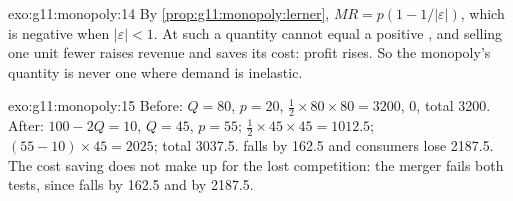 \begin{solution}{exo:g11:monopoly:14}
By \cref{prop:g11:monopoly:lerner}, $\mathit{MR} = p(1 - 1/|\varepsilon|)$, which is negative when $|\varepsilon| < 1$. At such a quantity  cannot equal a positive
, and selling one unit fewer raises revenue and saves its cost: profit rises. So the monopoly's quantity is never one where demand is inelastic.
\end{solution}

\begin{solution}{exo:g11:monopoly:15}
Before: $Q = 80$, $p = 20$,  $\tfrac12 \times 80 \times 80 = 3200$,  0, total 3200. After: $100 - 2Q = 10$, $Q = 45$, $p = 55$;  $\tfrac12
\times 45 \times 45 = 1012.5$;  $(55 - 10) \times 45 = 2025$; total 3037.5.  falls by 162.5 and consumers lose 2187.5. The cost saving does not make up
for the lost competition: the merger fails both tests, since  falls by 162.5 and  by 2187.5.
\end{solution}

